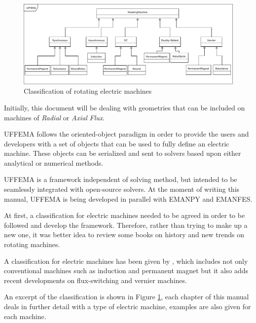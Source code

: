 \documentclass{tufte-book} %
\begin{document}
 \begin{figure}[h]
 \includegraphics[width=\linewidth]{RotatingMachine.pdf}
 \caption{Classification of rotating electric machines 
 }
 \label{fig:fullfig}
 \end{figure} 

Initially, this document will be dealing with geometries that can be included on machines of \textit{Radial} or \textit{Axial} \textit{Flux}.

UFFEMA follows the oriented-object paradigm in order to provide the users and developers with a set of objects that can be used to fully define an electric machine. These objects can be serialized and sent to solvers based upon either analytical or numerical methods.

UFFEMA is a framework independent of solving method, but intended to be seamlessly integrated with open-source solvers. At the moment of writing this manual, UFFEMA is being developed in parallel with EMANPY\cite{ajpina_emanpy_2018} and EMANFES\cite{ajpina_emanfes_2018}.  

At first, a classification for electric machines needed to be agreed in order to be followed and develop the framework. Therefore, rather than trying to make up a new one, it was better idea to review some books on history and new trends on rotating machines. 

A classification for electric machines has been given by \cite{ktchau_2015}, which includes not only conventional machines such as induction and permanent magnet but it also adds recent developments on flux-switching and vernier machines.

An excerpt of the classification is shown in Figure \ref{fig:fullfig}, each chapter of this manual deals in further detail with a type of electric machine, examples are also given for each machine. 


\end{document}
